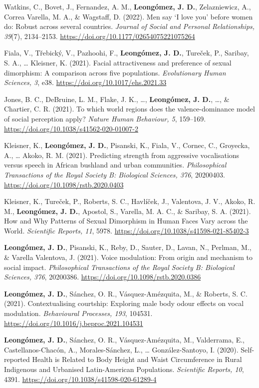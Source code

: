 \documentclass[11pt,a4paper,]{awesome-cv}
\begin{document}
Watkins, C., Bovet, J., Fernandez, A. M., \textbf{Leongómez, J. D.},
Zelazniewicz, A., Correa Varella, M. A., \& Wagstaff, D. (2022). Men say
`I love you' before women do: Robust across several countries.
\emph{Journal of Social and Personal Relationships, 39}(7), 2134--2153.
\url{https://doi.org/10.1177/02654075221075264}

Fiala, V., Třebický, V., Pazhoohi, F., \textbf{Leongómez, J. D.},
Tureček, P., Saribay, S. A., \ldots{} Kleisner, K. (2021). Facial
attractiveness and preference of sexual dimorphism: A comparison across
five populations. \emph{Evolutionary Human Sciences, 3}, e38.
\url{https://doi.org/10.1017/ehs.2021.33}

Jones, B. C., DeBruine, L. M., Flake, J. K., \ldots,
\textbf{Leongómez, J. D.}, \ldots, \& Chartier, C. R. (2021). To which
world regions does the valence-dominance model of social perception
apply? \emph{Nature Human Behaviour, 5}, 159--169.
\url{https://doi.org/10.1038/s41562-020-01007-2}

Kleisner, K., \textbf{Leongómez, J. D.}, Pisanski, K., Fiala, V.,
Cornec, C., Groyecka, A., \ldots{} Akoko, R. M. (2021). Predicting
strength from aggressive vocalisations versus speech in African bushland
and urban communities. \emph{Philosophical Transactions of the Royal
Society B: Biological Sciences, 376}, 20200403.
\url{https://doi.org/10.1098/rstb.2020.0403}

Kleisner, K., Tureček, P., Roberts, S. C., Havlíček, J., Valentova, J.
V., Akoko, R. M., \textbf{Leongómez, J. D.}, Apostol, S., Varella, M. A.
C., \& Saribay, S. A. (2021). How and Why Patterns of Sexual Dimorphism
in Human Faces Vary across the World. \emph{Scientific Reports, 11},
5978. \url{https://doi.org/10.1038/s41598-021-85402-3}

\textbf{Leongómez, J. D.}, Pisanski, K., Reby, D., Sauter, D., Lavan,
N., Perlman, M., \& Varella Valentova, J. (2021). Voice modulation: From
origin and mechanism to social impact. \emph{Philosophical Transactions
of the Royal Society B: Biological Sciences, 376}, 20200386.
\url{https://doi.org/10.1098/rstb.2020.0386}

\textbf{Leongómez, J. D.}, Sánchez, O. R., Vásquez-Amézquita, M., \&
Roberts, S. C. (2021). Contextualising courtship: Exploring male body
odour effects on vocal modulation. \emph{Behavioural Processes, 193},
104531. \url{https://doi.org/10.1016/j.beproc.2021.104531}

\textbf{Leongómez, J. D.}, Sánchez, O. R., Vásquez-Amézquita, M.,
Valderrama, E., Castellanos-Chacón, A., Morales-Sánchez, L., \ldots{}
González-Santoyo, I. (2020). Self-reported Health is Related to Body
Height and Waist Circumference in Rural Indigenous and Urbanised
Latin-American Populations. \emph{Scientific Reports, 10}, 4391.
\url{https://doi.org/10.1038/s41598-020-61289-4}
\end{document}
